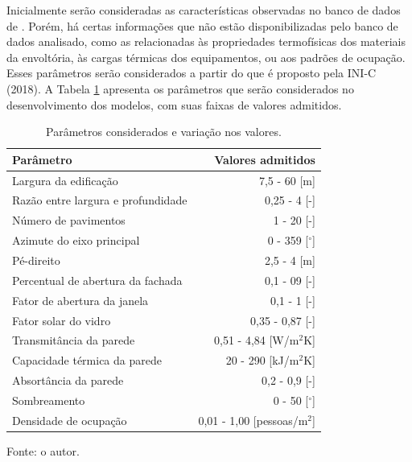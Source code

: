 \documentclass[brazil,hardcopy,openany,a5paper]{ufscthesis}
\begin{document}
		Inicialmente serão consideradas as características observadas no banco de dados de  \cite{Pereira2018}. Porém, há certas informações que não estão disponibilizadas pelo banco de dados analisado, como as relacionadas às propriedades termofísicas dos materiais da envoltória, às cargas térmicas dos equipamentos, ou aos padrões de ocupação. Esses parâmetros serão considerados a partir do que é proposto pela INI-C (2018). A Tabela \ref{table:parametros} apresenta os parâmetros que serão considerados no desenvolvimento dos modelos, com suas faixas de valores admitidos.	
		
		
		\begin{table}[h]
			\centering
			\caption{Parâmetros considerados e variação nos valores.}
			\label{table:parametros}
			\begin{tabular}{|l |r |}
				\hline
				\textbf{Parâmetro} & \textbf{Valores admitidos} \\
				\hline
				Largura da edificação & 7,5 - 60 [m] \\
				\hline
				Razão entre largura e profundidade & 0,25 - 4 [-] \\
				\hline
				Número de pavimentos & 1 - 20 [-] \\
				\hline 
				Azimute do eixo principal & 0 - 359 [$^{\circ}$] \\
				\hline 
				Pé-direito & 2,5 - 4 [m] \\
				\hline 
				Percentual de abertura da fachada & 0,1 - 09 [-] \\
				\hline 
				Fator de abertura da janela & 0,1 - 1 [-] \\
				\hline 
				Fator solar do vidro & 0,35 - 0,87 [-] \\
				\hline 
				Transmitância da parede & 0,51 - 4,84 [W/m$^2$K] \\
				\hline 
				Capacidade térmica da parede & 20 - 290 [kJ/m$^2$K] \\
				\hline 
				Absortância da parede & 0,2 - 0,9 [-] \\
				\hline 
				Sombreamento & 0 - 50 [$^{\circ}$] \\
				\hline 
				Densidade de ocupação & 0,01 - 1,00 [pessoas/m$^2$] \\
				\hline 
			\end{tabular}
			\begin{flushleft}
				Fonte: o autor.
			\end{flushleft}				
		\end{table}
\end{document}
